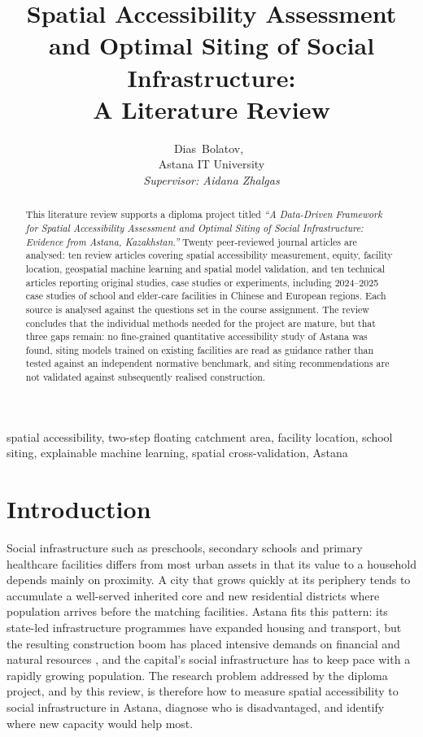 \documentclass[journal]{IEEEtran}
\title{Spatial Accessibility Assessment and Optimal Siting of Social Infrastructure:\\ A Literature Review}
\author{Dias~Bolatov,~\IEEEmembership{BSc Big Data Analysis (6B06103)}\\
        Astana IT University\\
        \textit{Supervisor: Aidana Zhalgas}}
\begin{document}
\maketitle

\begin{abstract}
This literature review supports a diploma project titled \emph{``A Data-Driven Framework for Spatial Accessibility Assessment and Optimal Siting of Social Infrastructure: Evidence from Astana, Kazakhstan.''} Twenty peer-reviewed journal articles are analysed: ten review articles covering spatial accessibility measurement, equity, facility location, geospatial machine learning and spatial model validation, and ten technical articles reporting original studies, case studies or experiments, including 2024--2025 case studies of school and elder-care facilities in Chinese and European regions. Each source is analysed against the questions set in the course assignment. The review concludes that the individual methods needed for the project are mature, but that three gaps remain: no fine-grained quantitative accessibility study of Astana was found, siting models trained on existing facilities are read as guidance rather than tested against an independent normative benchmark, and siting recommendations are not validated against subsequently realised construction.
\end{abstract}

\begin{IEEEkeywords}
spatial accessibility, two-step floating catchment area, facility location, school siting, explainable machine learning, spatial cross-validation, Astana
\end{IEEEkeywords}

\section{Introduction}
\label{sec:intro}

Social infrastructure such as preschools, secondary schools and primary healthcare facilities differs from most urban assets in that its value to a household depends mainly on proximity. A city that grows quickly at its periphery tends to accumulate a well-served inherited core and new residential districts where population arrives before the matching facilities. Astana fits this pattern: its state-led infrastructure programmes have expanded housing and transport, but the resulting construction boom has placed intensive demands on financial and natural resources \cite{astana2025}, and the capital's social infrastructure has to keep pace with a rapidly growing population. The research problem addressed by the diploma project, and by this review, is therefore how to measure spatial accessibility to social infrastructure in Astana, diagnose who is disadvantaged, and identify where new capacity would help most.
\end{document}
